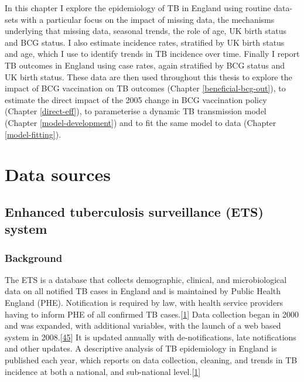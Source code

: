 \documentclass[11pt,twoside]{bristolthesis}
\begin{document}
  In this chapter I explore the epidemiology of TB in England using routine data-sets with a particular focus on the impact of missing data, the mechanisms underlying that missing data, seasonal trends, the role of age, UK birth status and BCG status. I also estimate incidence rates, stratified by UK birth status and age, which I use to identify trends in TB incidence over time. Finally I report TB outcomes in England using case rates, again stratified by BCG status and UK birth status. These data are then used throughout this thesis to explore the impact of BCG vaccination on TB outcomes (Chapter \ref{beneficial-bcg-out}), to estimate the direct impact of the 2005 change in BCG vaccination policy (Chapter \ref{direct-eff}), to parameterise a dynamic TB transmission model (Chapter \ref{model-development}) and to fit the same model to data (Chapter \ref{model-fitting}).
  
  \hypertarget{data-sources}{%
  \section{Data sources}\label{data-sources}}
  
  \hypertarget{ets-deep-dive}{%
  \subsection{Enhanced tuberculosis surveillance (ETS) system}\label{ets-deep-dive}}
  
  \hypertarget{background-1}{%
  \subsubsection{Background}\label{background-1}}
  
  The ETS is a database that collects demographic, clinical, and microbiological data on all notified TB cases in England and is maintained by Public Health England (PHE). Notification is required by law, with health service providers having to inform PHE of all confirmed TB cases.{[}\protect\hyperlink{ref-PHE2017}{1}{]} Data collection began in 2000 and was expanded, with additional variables, with the launch of a web based system in 2008.{[}\protect\hyperlink{ref-Kriujshaar2007}{45}{]} It is updated annually with de-notifications, late notifications and other updates. A descriptive analysis of TB epidemiology in England is published each year, which reports on data collection, cleaning, and trends in TB incidence at both a national, and sub-national level.{[}\protect\hyperlink{ref-PHE2017}{1}{]}
  
\end{document}

